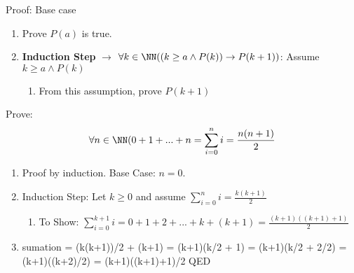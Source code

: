 Proof: Base case
\begin{enumerate}
\item Prove $P(a)$ is true.
\item \textbf{Induction Step} $\to$ $\forall k \in \NN ((k\ge a \wedge P(k)) \to P(k+1))$: Assume $k \ge a \wedge P(k)$
	\begin{enumerate}
	\item From this assumption, prove $P(k+1)$
	\end{enumerate}
\end{enumerate}

Prove: \[ \forall n \in \NN ( 0+1+...+n = \sum_{i=0}^n i = \frac{n(n+1)}{2} \]

\begin{enumerate}
\item Proof by induction. Base Case: $n = 0$.
\item Induction Step: Let $k \ge 0$ and assume $\displaystyle\sum_{i=0}^n i = \frac{k(k+1)}{2} $
	\begin{enumerate}
	\item To Show: $\displaystyle\sum_{i=0}^{k+1} i = 0 + 1 + 2 + ... + k + (k+1) = \frac{(k+1)((k+1)+1)}{2} $
	\end{enumerate}
\item sumation = (k(k+1))/2 + (k+1) = (k+1)(k/2 + 1) = (k+1)(k/2 + 2/2) = (k+1)((k+2)/2) = (k+1)((k+1)+1)/2 QED 
\end{enumerate}


